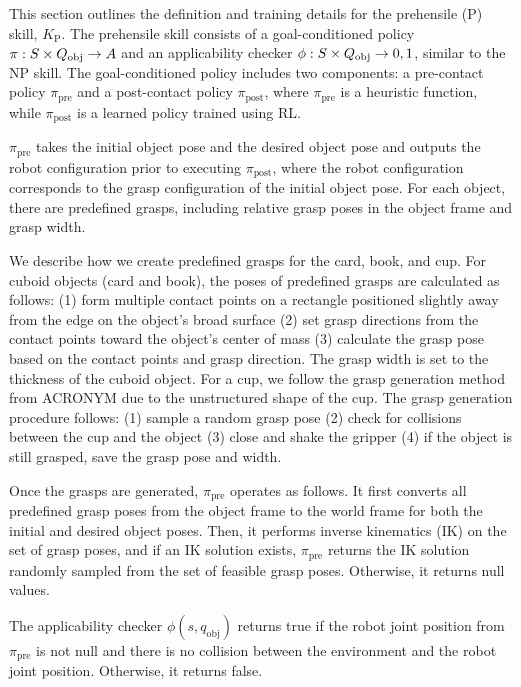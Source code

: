This section outlines the definition and training details for the prehensile (P) skill, $K_\text{P}$. The prehensile skill consists of a goal-conditioned policy $ \pi: S \times Q_\text{obj} \rightarrow A $ and an applicability checker $ \phi:S \times Q_\text{obj} \rightarrow {0,1} $, similar to the NP skill. The goal-conditioned policy includes two components: a pre-contact policy $ \pi_{\text{pre}} $ and a post-contact policy $ \pi_{\text{post}} $, where $ \pi_{\text{pre}} $ is a heuristic function, while $ \pi_{\text{post}} $ is a learned policy trained using RL.

$ \pi_{\text{pre}} $ takes the initial object pose and the desired object pose and outputs the robot configuration prior to executing $ \pi_{\text{post}} $, where the robot configuration corresponds to the grasp configuration of the initial object pose. For each object, there are predefined grasps, including relative grasp poses in the object frame and grasp width.

We describe how we create predefined grasps for the card, book, and cup. For cuboid objects (card and book), the poses of predefined grasps are calculated as follows: (1) form multiple contact points on a rectangle positioned slightly away from the edge on the object’s broad surface (2) set grasp directions from the contact points toward the object's center of mass (3) calculate the grasp pose based on the contact points and grasp direction. The grasp width is set to the thickness of the cuboid object. For a cup, we follow the grasp generation method from ACRONYM \cite{eppner2021acronym} due to the unstructured shape of the cup. The grasp generation procedure follows: (1) sample a random grasp pose (2) check for collisions between the cup and the object (3) close and shake the gripper (4) if the object is still grasped, save the grasp pose and width.

Once the grasps are generated, $ \pi_{\text{pre}} $ operates as follows. It first converts all predefined grasp poses from the object frame to the world frame for both the initial and desired object poses. Then, it performs inverse kinematics (IK) on the set of grasp poses, and if an IK solution exists, $ \pi_{\text{pre}} $ returns the IK solution randomly sampled from the set of feasible grasp poses. Otherwise, it returns null values.

The applicability checker $ \phi(s, q_{\text{obj}}) $ returns true if the robot joint position from $ \pi_{\text{pre}} $ is not null and there is no collision between the environment and the robot joint position. Otherwise, it returns false.

